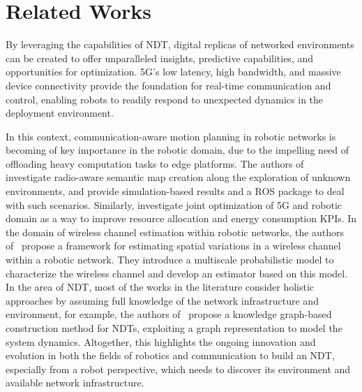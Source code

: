 \section{Related Works}
\label{sec:related}

By leveraging the capabilities of NDT, digital replicas of networked environments can be created to offer unparalleled insights, predictive capabilities, and opportunities for optimization. 5G's low latency, high bandwidth, and massive device connectivity provide the foundation for real-time communication and control, enabling robots to readily respond to unexpected dynamics in the deployment environment. 

In this context, communication-aware motion planning in robotic networks is becoming of key importance in the robotic domain, due to the impelling need of offloading heavy computation tasks to edge platforms. 
The authors of~\cite{5GERA_IROS} investigate radio-aware semantic map creation along the exploration of unknown environments, and provide simulation-based results and a ROS package to deal with such scenarios. Similarly, \cite{online_OROS} investigate joint optimization of 5G and robotic domain as a way to improve resource allocation and energy consumption KPIs. %
In the domain of wireless channel estimation within robotic networks, the authors of~\cite{5509677} propose a framework for estimating spatial variations in a wireless channel within a robotic network. They introduce a multiscale probabilistic model to characterize the wireless channel and develop an estimator based on this model.
In the area of NDT, most of the works in the literature consider holistic approaches by assuming full knowledge of the network infrastructure and environment, for example, the authors of~\cite{Graph_DTN} propose a knowledge graph-based construction method for NDTs, exploiting a graph representation to model the system dynamics. %
Altogether, this highlights the ongoing innovation and evolution in both the fields of robotics and communication to build an NDT, especially from a robot perspective, which needs to discover its environment and available network infrastructure. %

